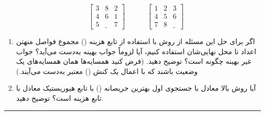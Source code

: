\documentclass[a4paper,10pt]{article}
\begin{document}
$$
\quad
\begin{bmatrix}
	3 & 8 & 2 \\
	4 & 6 & 1 \\
	5 & \_ & 7
\end{bmatrix}
\qquad
\quad
\begin{bmatrix}
	1 & 2 & 3 \\
	4 & 5 & 6 \\
	7 & 8 & \_
\end{bmatrix}
$$

\begin{enumerate}
	\item[(الف)] اگر برای حل این مسئله از روش  با استفاده از تابع هزینه () مجموع فواصل منهتن اعداد تا محل نهایی‌شان استفاده کنیم، آیا لزوماً جواب بهینه به‌دست می‌آید؟ جواب غیر بهینه چگونه است؟ توضیح دهید. (فرض کنید همسایه‌ها همان همسایه‌های یک وضعیت باشند که با اعمال یک کنش () معتبر به‌دست می‌آیند.)
	
	\item[(ب)] آیا روش بالا معادل با جستجوی اول بهترین حریصانه () با تابع هیوریستیک معادل با تابع هزینه است؟ توضیح دهید.
\end{enumerate}

\bigskip
\bigskip
\textcolor{AccentCyan}{\rule{\linewidth}{0.4pt}}

\end{document}
